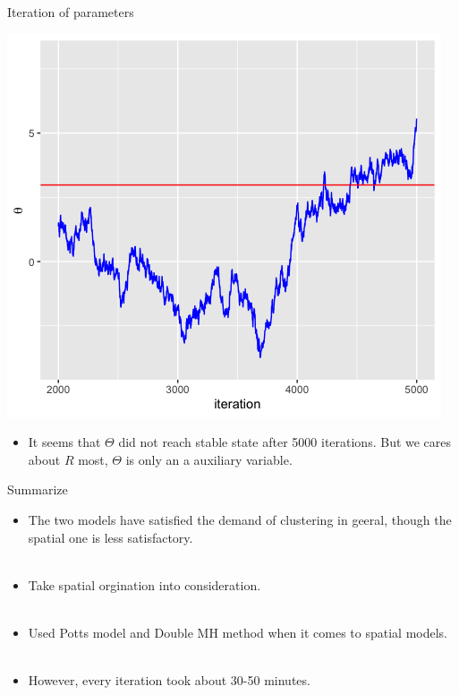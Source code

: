 \documentclass[10 pt]{beamer}
\begin{document}
\begin{frame}{Iteration of parameters}
\centerline{\includegraphics[scale=0.4]{pic/sp_theta_6.png}}
\begin{itemize}
	\item It seems that $\Theta$ did not reach stable state after 5000 iterations. But we cares about $R$ most, $\Theta$ is only an a auxiliary variable.
	\end{itemize}
\end{frame}

\begin{frame}{Summarize}
\begin{itemize}
	\item The two models have satisfied the demand of clustering in geeral, though the spatial one is less satisfactory.
	~\\
	~\\
	\item Take spatial orgination into consideration.
	~\\
	~\\
	\item Used Potts model and Double MH method when it comes to spatial models.
	~\\
	~\\
	\item However, every iteration took about 30-50 minutes.
\end{itemize}
\end{frame}
\end{document}
